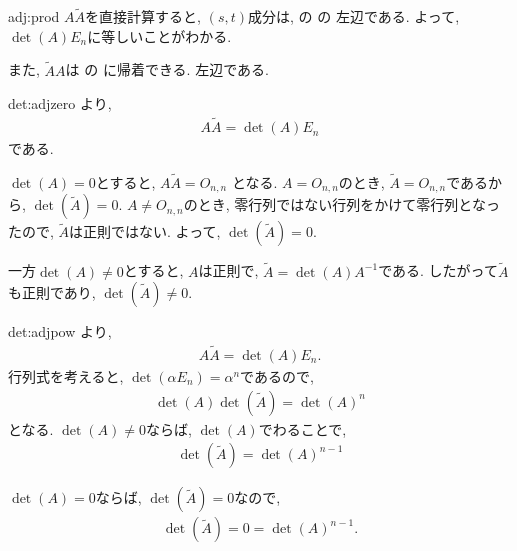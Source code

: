 \begin{proofof}{adj:prod}
  $A\tilde A$を直接計算すると,
  $(s,t)$成分は,
  の
  の
  左辺である.
  よって, $\det(A)E_n$に等しいことがわかる.

  また, $\tilde A A$は
  の
  に帰着できる.
  左辺である.
\end{proofof}

\begin{proofof*}{det:adj}{zero}
  より,
  \begin{align*}
    A \tilde A =\det(A)E_n
  \end{align*}
  である.

  $\det(A)=0$とすると,
  $A \tilde A =O_{n,n}$
  となる.
  $A=O_{n,n}$のとき, $\tilde A=O_{n,n}$であるから,
  $\det(\tilde A)=0$.
  $A\neq O_{n,n}$のとき,
  零行列ではない行列をかけて零行列となったので,
  $\tilde A$は正則ではない.
  よって, $\det(\tilde A)=0$.
  
  一方$\det(A)\neq 0$とすると,
  $A$は正則で,
  $\tilde A=\det(A)A^{-1}$である.
  したがって$\tilde A$も正則であり,
  $\det(\tilde A)\neq 0$.


\end{proofof*}
\begin{proofof*}{det:adj}{pow}
より,
\begin{align*}
  A \tilde A =\det(A)E_n.
\end{align*}
行列式を考えると,
$\det(\alpha E_n)=\alpha^n$であるので,
\begin{align*}
  \det(A) \det(\tilde A) =\det(A)^n
\end{align*}
となる.
$\det(A)\neq 0$ならば,
$\det(A)$でわることで,
\begin{align*}
  \det(\tilde A) =\det(A)^{n-1}
\end{align*}

$\det(A)=0$ならば, 
$\det(\tilde A)=0$なので,
\begin{align*}
  \det(\tilde A)=0 =\det(A)^{n-1}.
\end{align*}

\end{proofof*}


